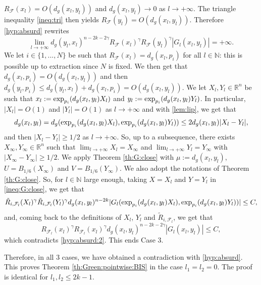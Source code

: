 \documentclass[reqno]{amsart}
\def \rn {\mathbb{R}^n}
\def \nn {\mathbb{N}}
\def \F {{\mathcal F}}
\begin{document}
\medskip{} $R_{\F}(x_l)=O(d_g(x_l, y_l))$ and $d_g(x_l, y_l)\to 0$ as $l\to +\infty$. The triangle inequality \eqref{ineq:tri} then yields $R_{\F}(y_l)=O(d_g(x_l,y_l))$. Therefore \eqref{hyp:absurd} rewrites
\begin{equation}\label{hyp:absurd:2}
\lim_{l\to +\infty}   d_g(y_l, x_l)^{n-2k-2\gamma}R_{\F}(x_l)^\gamma R_{\F}(y_l)^{\gamma}|G_l(x_l,y_l)| =+\infty.
\end{equation}
We let $i\in\{1,...,N\}$ be such that $R_{\F}(x_l)=d_g(x_l, p_i)$ for all $l\in\nn$: this is possible up to extraction since $N$ is fixed.  We then get that $d_g(x_l, p_i)=O(d_g(x_l, y_l))$ and then $d_g(y_l, p_i)\leq d_g(y_l, x_l)+ d_g(x_l, p_i)=O(d_g(x_l, y_l))$. We let $X_l, Y_l\in\rn$ be such that  $x_l:=\hbox{exp}_{p_i}(d_g(x_l, y_l)X_l)$ and  $y_l:=\hbox{exp}_{p_i}(d_g(x_l, y_l)Y_l)$. In particular, $ |X_l|=O(1)$ and $|Y_l|=O(1)$ as $l\to +\infty$ and with \eqref{lem:lip}, we get that
$$d_g(x_l, y_l)=d_g(\hbox{exp}_{p_i}(d_g(x_l, y_l)X_l),\hbox{exp}_{p_i}(d_g(x_l, y_l)Y_l))\leq 2d_g(x_l, y_l) |X_l-Y_l|,$$
and then $|X_l-Y_l|\geq 1/2$ as $l\to +\infty$. So, up to a subsequence, there exists $X_\infty,Y_\infty\in\rn$ such that  $\lim_{l\to +\infty}X_l=X_\infty$ and $\lim_{l\to +\infty}Y_l=Y_\infty$ with $|X_\infty-Y_\infty|\geq 1/2$. We apply Theorem \ref{th:G:close} with  $\mu:=d_g(x_l, y_l)$, $U=B_{1/6}(X_\infty)$ and $V=B_{1/6}(Y_\infty)$. We also adopt the notations of Theorem \ref{th:G:close}. So, for $l\in\nn$ large enough, taking $X=X_l$ and $Y=Y_l$ in \eqref{ineq:G:close}, we get that
$$\tilde{R}_{i, \F_l}(X_l)^\gamma \tilde{R}_{i, \F_l}(Y_l)^\gamma d_g(x_l,y_l)^{n-2k}|G_l(\hbox{exp}_{p_i}(d_g(x_l, y_l)X_l),\hbox{exp}_{p_i}(d_g(x_l, y_l)Y_l))|\leq C,$$
and, coming back to the definitions of $X_l$, $Y_l$ and $\tilde{R}_{i, \F_l}$, we get that
$$ R_{ \F_l}(x_l)^\gamma R_{ \F_l}(x_l)^\gamma  d_g(x_l,y_l)^{n-2k-2\gamma}|G_l(x_l,y_l)|\leq C,$$
which contradicts \eqref{hyp:absurd:2}. This ends Case 3.

\medskip\noindent Therefore, in all 3 cases, we have obtained a contradiction with \eqref{hyp:absurd}. This proves Theorem \ref{th:Green:pointwise:BIS} in the case $l_1=l_2=0$. The proof is identical for $l_1,l_2\leq 2k-1$. 
\end{document}
